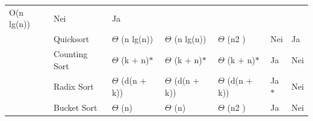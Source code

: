 \documentclass[12pt]{report}
\begin{document}
\begin{table}[H]
\begin{tabular}{p{0.56in}p{1.29in}p{0.7in}p{0.7in}p{0.7in}p{0.56in}p{0.55in}}
\multicolumn{1}{p{0.7in}}{{\fontsize{10pt}{12.0pt}\selectfont O(n lg(n)) }} & 
\multicolumn{1}{p{0.56in}}{{\fontsize{10pt}{12.0pt}\selectfont Nei}} & 
\multicolumn{1}{p{0.55in}}{{\fontsize{10pt}{12.0pt}\selectfont Ja}} \\
\hhline{~~~~~~~}
\multicolumn{1}{p{0.56in}}{} & 
\multicolumn{1}{p{1.29in}}{{\fontsize{10pt}{12.0pt}\selectfont Quicksort }} & 
\multicolumn{1}{p{0.7in}}{{\fontsize{10pt}{12.0pt}\selectfont $ \Theta $ (n lg(n)) }} & 
\multicolumn{1}{p{0.7in}}{{\fontsize{10pt}{12.0pt}\selectfont $ \Theta $ (n lg(n))}} & 
\multicolumn{1}{p{0.7in}}{{\fontsize{10pt}{12.0pt}\selectfont $ \Theta $ (n2 ) }} & 
\multicolumn{1}{p{0.56in}}{{\fontsize{10pt}{12.0pt}\selectfont Nei}} & 
\multicolumn{1}{p{0.55in}}{{\fontsize{10pt}{12.0pt}\selectfont Ja}} \\
\hhline{~~~~~~~}
\multicolumn{1}{p{0.56in}}{} & 
\multicolumn{1}{p{1.29in}}{{\fontsize{10pt}{12.0pt}\selectfont Counting Sort }} & 
\multicolumn{1}{p{0.7in}}{{\fontsize{10pt}{12.0pt}\selectfont $ \Theta $ (k + n)$\ast$ }} & 
\multicolumn{1}{p{0.7in}}{{\fontsize{10pt}{12.0pt}\selectfont $ \Theta $ (k + n)$\ast$ }} & 
\multicolumn{1}{p{0.7in}}{{\fontsize{10pt}{12.0pt}\selectfont $ \Theta $ (k + n)$\ast$ }} & 
\multicolumn{1}{p{0.56in}}{{\fontsize{10pt}{12.0pt}\selectfont Ja}} & 
\multicolumn{1}{p{0.55in}}{{\fontsize{10pt}{12.0pt}\selectfont Nei}} \\
\hhline{~~~~~~~}
\multicolumn{1}{p{0.56in}}{} & 
\multicolumn{1}{p{1.29in}}{{\fontsize{10pt}{12.0pt}\selectfont Radix Sort }} & 
\multicolumn{1}{p{0.7in}}{{\fontsize{10pt}{12.0pt}\selectfont $ \Theta $ (d(n + k))}} & 
\multicolumn{1}{p{0.7in}}{{\fontsize{10pt}{12.0pt}\selectfont $ \Theta $ (d(n + k)) }} & 
\multicolumn{1}{p{0.7in}}{{\fontsize{10pt}{12.0pt}\selectfont $ \Theta $ (d(n + k))}} & 
\multicolumn{1}{p{0.56in}}{{\fontsize{10pt}{12.0pt}\selectfont Ja$\ast$ }} & 
\multicolumn{1}{p{0.55in}}{{\fontsize{10pt}{12.0pt}\selectfont Nei}} \\
\hhline{~~~~~~~}
\multicolumn{1}{p{0.56in}}{} & 
\multicolumn{1}{p{1.29in}}{{\fontsize{10pt}{12.0pt}\selectfont Bucket Sort }} & 
\multicolumn{1}{p{0.7in}}{{\fontsize{10pt}{12.0pt}\selectfont $ \Theta $ (n) }} & 
\multicolumn{1}{p{0.7in}}{{\fontsize{10pt}{12.0pt}\selectfont $ \Theta $ (n) }} & 
\multicolumn{1}{p{0.7in}}{{\fontsize{10pt}{12.0pt}\selectfont $ \Theta $ (n2 )}} & 
\multicolumn{1}{p{0.56in}}{{\fontsize{10pt}{12.0pt}\selectfont Ja}} & 
\multicolumn{1}{p{0.55in}}{{\fontsize{10pt}{12.0pt}\selectfont Nei}} \\

\end{tabular}
\end{table}
\end{document}
